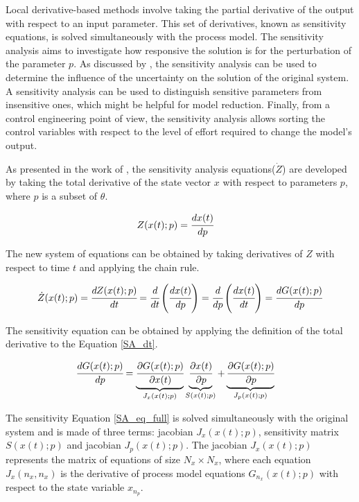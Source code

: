 \documentclass[../Article_Model_Parameters.tex]{subfiles}
\begin{document}
	
	Local derivative-based methods involve taking the partial derivative of the output with respect to an input parameter. This set of derivatives, known as sensitivity equations, is solved simultaneously with the process model. The sensitivity analysis aims to investigate how responsive the solution is for the perturbation of the parameter ${p}$. As discussed by \citet{Dickinson1976}, the sensitivity analysis can be used to determine the influence of the uncertainty on the solution of the original system. A sensitivity analysis can be used to distinguish sensitive parameters from insensitive ones, which might be helpful for model reduction. Finally, from a control engineering point of view, the sensitivity analysis allows sorting the control variables with respect to the level of effort required to change the model's output.
	
	As presented in the work of \citet{Maly1996}, the sensitivity analysis equations(${\dot{Z}}$) are developed by taking the total derivative of the state vector $x$ with respect to parameters $p$, where $p$ is a subset of $\theta$.
	
	{\footnotesize
		\begin{align}
			{Z}({x}(t);{p}) &= \cfrac{d {x}(t)}{d {p}}
	\end{align} }
	
	The new system of equations can be obtained by taking derivatives of $Z$ with respect to time $t$ and applying the chain rule.
	
	{\footnotesize
		\begin{equation} \label{SA_dt} 
			{\dot{Z}}({x}(t);{p})  = \cfrac{d {Z}(x(t);{p})}{d t} = \cfrac{d}{d t} \left( \cfrac{d {x}(t)}{d {p}} \right) = \cfrac{d }{d {p}} \left( \cfrac{d {x}(t)}{d t} \right) = \cfrac{d {G}({x}(t);{p})}{d {p}} 
	\end{equation} }
	
	The sensitivity equation can be obtained by applying the definition of the total derivative to the Equation \ref{SA_dt}.
	
	{\footnotesize
		\begin{align}		
			\label{SA_eq_full}\cfrac{d {G}({x}(t);{p})}{d {p}} &=  \underbrace{ \cfrac{\partial {G}({x}(t);{p})}{\partial {x}(t)} }_{{J_x}({x}(t);{p})} \underbrace{\cfrac{\partial {x}(t)}{\partial {p}} }_{{S}({x}(t);{p})} + \underbrace{ \cfrac{\partial {G}({x}(t);{p})}{\partial {p}} }_{{J_p}({x}(t);{p})}
	\end{align} }
	
	The sensitivity Equation \ref{SA_eq_full} is solved simultaneously with the original system and is made of three terms: jacobian ${J_x}({x}(t);{p})$, sensitivity matrix ${S}({x}(t);{p})$ and jacobian ${J_p}({x}(t);{p})$. The jacobian ${J_x}({x}(t);{p})$ represents the matrix of equations of size $N_x \times N_x$, where each equation ${J_x}(n_x,n_x)$ is the derivative of process model equations ${G}_{n_x}({x}(t);{p})$ with respect to the state variable $x_{n_p}$.
	
\end{document}
